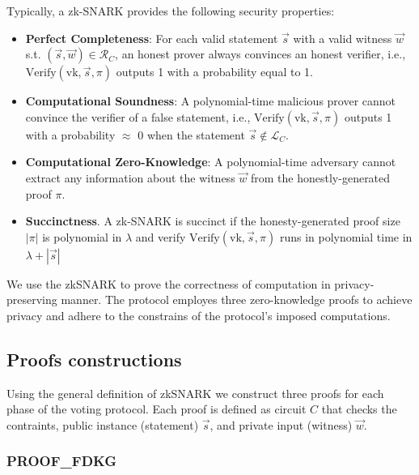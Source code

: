 \documentclass[runningheads]{llncs}
\begin{document}
Typically, a zk-SNARK provides the following security properties:
\begin{itemize}
    \item \textbf{Perfect Completeness}: For each valid statement $\vec{s}$ with a valid witness $\vec{w}$ s.t. $(\vec{s}, \vec{w}) \in \mathcal{R}_C$, an honest prover always convinces an honest verifier, i.e., $\textrm{Verify}(\textrm{vk}, \vec{s}, \pi)$ outputs 1 with a probability equal to 1.
    \item \textbf{Computational Soundness}: A polynomial-time malicious prover cannot convince the verifier of a false statement, i.e., $\textrm{Verify}(\textrm{vk}, \vec{s}, \pi)$ outputs 1 with a probability $\approx$ 0 when the statement $\vec{s} \notin \mathcal{L}_C$.
    \item \textbf{Computational Zero-Knowledge}: A polynomial-time adversary cannot extract any information about the witness $\vec{w}$ from the honestly-generated proof $\pi$. 
    \item \textbf{Succinctness}. A zk-SNARK is succinct if the honesty-generated proof size $|\pi|$ is polynomial in $\lambda$ and verify $\textrm{Verify}(\textrm{vk}, \vec{s}, \pi)$ runs in polynomial time in $\lambda + |\vec{s}|$
\end{itemize}

We use the zkSNARK to prove the correctness of computation in privacy-preserving manner.
The protocol employes three zero-knowledge proofs to achieve privacy and adhere to the constrains of the protocol's imposed computations.



\subsection{Proofs constructions}\label{sec:proofs}

Using the general definition of zkSNARK we construct three proofs for each phase of the voting protocol. Each proof is defined as circuit $C$ that checks the contraints, public instance (statement) $\vec{s}$, and private input (witness) $\vec{w}$.

\subsubsection{\textrm{PROOF}_\textrm{FDKG}}\label{sec:proof-fdkg}
\end{document}
